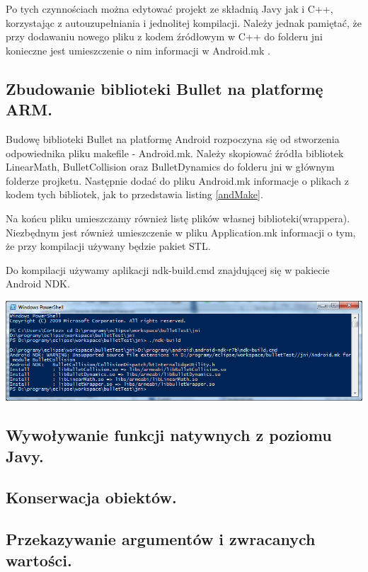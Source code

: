 \documentclass[12pt]{article}
\begin{document}
  
  
  Po tych czynnościach można edytować projekt ze składnią Javy jak i C++,
  korzystając z autouzupełniania i jednolitej kompilacji. Należy jednak
  pamiętać, że przy dodawaniu nowego pliku z kodem źródłowym w C++ do folderu
  jni konieczne jest umieszczenie o nim informacji w Android.mk .
  \subsection{Zbudowanie biblioteki Bullet na platformę ARM.}
Budowę biblioteki Bullet na platformę Android rozpoczyna się od stworzenia odpowiednika pliku makefile - Android.mk. Należy skopiować źródła bibliotek LinearMath, BulletCollision oraz BulletDynamics do folderu jni w głównym folderze projketu. Następnie dodać do pliku Android.mk informacje o plikach z kodem tych bibliotek, jak to przedstawia listing \ref{andMake}.

Na końcu pliku umieszczamy również listę plików własnej biblioteki(wrappera). Niezbędnym jest również umieszczenie w pliku Application.mk informacji o tym, że przy kompilacji używany będzie pakiet STL.

Do kompilacji używamy aplikacji ndk-build.cmd znajdującej się w pakiecie Android NDK.

\includegraphics[width=\textwidth]{./img/ndk-build.png}

\subsection{Wywoływanie funkcji natywnych z poziomu Javy.}

\subsection{Konserwacja obiektów.}

\subsection{Przekazywanie argumentów i zwracanych wartości.}
\end{document}
